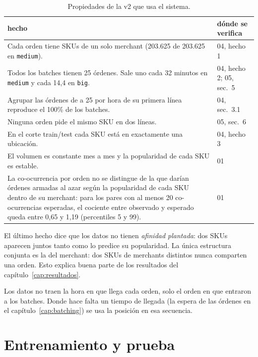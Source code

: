 \documentclass[11pt,a4paper,oneside]{report}
\newcommand{\code}[1]{\texttt{\small #1}}
\begin{document}
\begin{table}[ht]
\centering\small
\begin{tabularx}{\textwidth}{@{}L l@{}}
\toprule
hecho & dónde se verifica \\
\midrule
Cada orden tiene SKUs de un solo merchant (203.625 de 203.625 en \code{medium}). & 04, hecho 1 \\
Todos los batches tienen 25 órdenes. Sale uno cada 32 minutos en \code{medium} y cada 14,4 en \code{big}. & 04, hecho 2; 05, sec.~5 \\
Agrupar las órdenes de a 25 por hora de su primera línea reproduce el 100\% de los batches. & 04, sec.~3.1 \\
Ninguna orden pide el mismo SKU en dos líneas. & 05, sec.~6 \\
En el corte train/test cada SKU está en exactamente una ubicación. & 04, hecho 3 \\
El volumen es constante mes a mes y la popularidad de cada SKU es estable. & 01 \\
La co-ocurrencia por orden no se distingue de la que darían órdenes armadas al azar según la popularidad de cada SKU dentro de su merchant: para los pares con al menos 20 co-ocurrencias esperadas, el cociente entre observado y esperado queda entre 0,65 y 1,19 (percentiles 5 y 99). & 01 \\
\bottomrule
\end{tabularx}
\caption{Propiedades de la v2 que usa el sistema.}
\label{tab:hechos}
\end{table}

\begin{idea}
El último hecho dice que los datos no tienen \emph{afinidad plantada}: dos SKUs aparecen
juntos tanto como lo predice su popularidad. La única estructura conjunta es la del merchant:
dos SKUs de merchants distintos nunca comparten una orden. Esto explica buena parte de los
resultados del capítulo~\ref{cap:resultados}.
\end{idea}

\begin{supuesto}
Los datos no traen la hora en que llega cada orden, solo el orden en que entraron a los
batches. Donde hace falta un tiempo de llegada (la espera de las órdenes en el
capítulo~\ref{cap:batching}) se usa la posición en esa secuencia.
\end{supuesto}

\section{Entrenamiento y prueba}
\label{sec:split}
\end{document}
